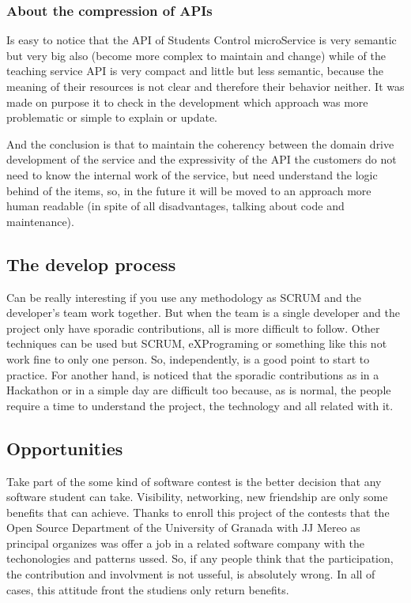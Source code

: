 \subsubsection{About the compression of APIs}

Is easy to notice that the API of Students Control microService is very semantic
but very big also (become more complex to maintain and change) while of the
teaching service API is very compact and little but less semantic, because the
meaning of their resources is not clear and therefore their behavior neither.
It was made on purpose it to check in the development which approach was more
problematic or simple to explain or update.

And the conclusion is that to maintain the coherency between the domain drive
development of the service and the expressivity of the API the customers do not
need to know the internal work of the service, but need understand the logic
behind of the items, so, in the future it will be moved to an approach more human
readable (in spite of all disadvantages, talking about code and maintenance). 

\subsection{The develop process}

Can be really interesting if you use any methodology as SCRUM and the developer's
team work together. But when the team is a single developer and the project only
have sporadic contributions,
all is more difficult to follow. Other techniques can be used but SCRUM, eXPrograming
or something like this not work fine to only one person.
So, independently, is a good point to start to practice. For another hand, is
 noticed that the sporadic contributions as in a Hackathon or in a simple day are
 difficult too because, as is normal, the people require a time to understand the
 project, the technology and all related with it.

\subsection{Opportunities}

Take part of the some kind of software contest is the better decision that any
software student can take. Visibility, networking, new friendship are only some
benefits that can achieve.
Thanks to enroll this project of the contests that the Open Source Department of
 the University of Granada with JJ Mereo as principal organizes was offer a job
 in a related software company with the techonologies and patterns ussed.
So, if any people think that the participation, the contribution and involvment
is not usseful, is absolutely wrong. In all of cases, this attitude front the
studiens only return benefits.

